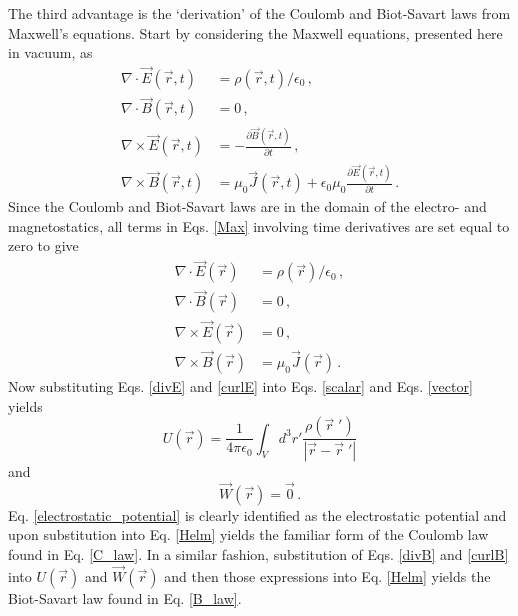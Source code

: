 \documentclass{article}
\begin{document}
The third advantage is the `derivation' of the Coulomb and Biot-Savart laws from Maxwell's equations.  Start by 
considering the Maxwell equations, presented here in vacuum, as
\begin{subequations}\label{Max}
\begin{align}\label{skippy}
  \nabla \cdot  \vec E(\vec r,t) & =  \rho(\vec r,t) / \epsilon_0                                            \, , \\ \label{dude}
  \nabla \cdot  \vec B(\vec r,t) & =  0                                                                      \, , \\ \label{betty}
  \nabla \times \vec E(\vec r,t) & =  -\frac{\partial \vec B (\vec r,t)}{\partial t}                         \, ,\\ \label{al}
  \nabla \times \vec B(\vec r,t) & =  \mu_0 \vec J (\vec r,t) + \epsilon_0 \mu_0 \frac{\partial \vec E(\vec r,t)}{\partial t} \, .
\end{align}
\end{subequations}
Since the Coulomb and Biot-Savart laws are in the domain of the electro- and magnetostatics, all terms in Eqs. \ref{Max}
involving time derivatives are set equal to zero to give
\begin{subequations}
\begin{align}\label{divE}
  \nabla \cdot  \vec E(\vec r) & =        \rho(\vec r) / \epsilon_0 \, ,\\
\label{divB}
  \nabla \cdot  \vec B(\vec r) & =  0                               \, , \\
\label{curlE}
  \nabla \times \vec E(\vec r) & =  0                               \, , \\
\label{curlB}
  \nabla \times \vec B(\vec r) & = \mu_0 \vec J (\vec r)            \, .
\end{align}
\end{subequations}
Now substituting Eqs. \ref{divE} and \ref{curlE} into Eqs. \ref{scalar} and Eqs. \ref{vector} yields
\begin{equation}\label{electrostatic_potential}
  U(\vec r) = \frac{1}{4 \pi \epsilon_0}\int_V d^3 r' \frac{\rho(\vec r \;')}{|\vec r - \vec r \;'|}
\end{equation}
and
\begin{equation}
  \vec W(\vec r) = \vec 0 \, .
\end{equation}
Eq. \ref{electrostatic_potential} is clearly identified as the electrostatic potential and upon substitution into
Eq. \ref{Helm} yields the familiar form of the Coulomb law found in Eq. \ref{C_law}.
In a similar fashion, substitution of Eqs. \ref{divB} and \ref{curlB} into $U(\vec r)$ and $\vec W (\vec r)$ and then those
expressions into Eq. \ref{Helm} yields the Biot-Savart law found in Eq. \ref{B_law}.
\end{document}
